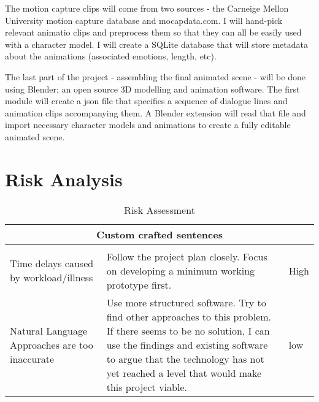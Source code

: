 The motion capture clips will come from two sources - the Carneige Mellon University motion capture database and mocapdata.com. I will hand-pick relevant animatio clips and preprocess them so that they can all be easily used with a character model. I will create a SQLite database that will store metadata about the animations (associated emotions, length, etc).

The last part of the project - assembling the final animated scene - will be done using Blender; an open source 3D modelling and animation software. The first module will create a json file that specifies a sequence of dialogue lines and animation clips accompanying them. A Blender extension will read that file and import necessary character models and animations to create a fully editable animated scene.

\section{Risk Analysis}

\begin{table}[!ht]
	\centering
	\small
	
	\begin{tabular}{ |p{16em} |p{18.8em}|p{4em}| }
	 \hline
	 \multicolumn{3}{|c|}{Custom crafted sentences} \\
	 \hline
		\thead{Risk} & \thead{Mitigation} & \thead{Level} \\
	 \hline
	 	Time delays caused by workload/illness & Follow the project plan closely. Focus on developing a minimum working prototype first. & High \\
	 \hline
		Natural Language Approaches are too inaccurate & Use more structured software. Try to find other approaches to this problem. If there seems to be no solution, I can use the findings and existing software to argue that the technology has not yet reached a level that would make this project viable.  &  low \\

	\end{tabular}

	 \caption{Risk Assessment}
	 \label{tab:riskassessment}
	 
\end{table}